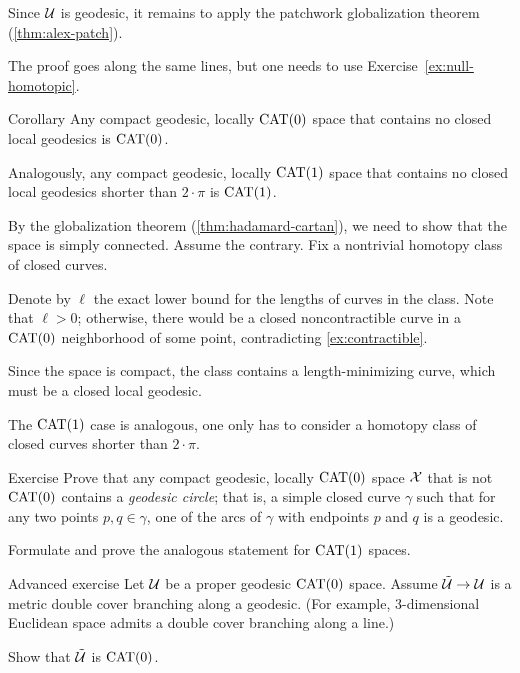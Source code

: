 Since $\mathcal{U}$ is geodesic, it remains to apply the patchwork globalization theorem (\ref{thm:alex-patch}).

The proof goes along the same lines, 
but one needs to use Exercise~\ref{ex:null-homotopic}. \qeds

\begin{thm}{Corollary}\label{cor:closed-geod-cat} 
Any compact geodesic, locally $\mathrm{CAT}(0)$ space that contains no closed local geodesics is $\mathrm{CAT}(0)$. 
 
Analogously, any compact geodesic, locally $\mathrm{CAT}(1)$ space that contains no closed local geodesics shorter than $2\cdot\pi$ is $\mathrm{CAT}(1)$.
\end{thm}

By the globalization theorem (\ref{thm:hadamard-cartan}), we need to show that the space is simply connected.
Assume the contrary. 
Fix a nontrivial homotopy class of closed curves.

Denote by $\ell$ the exact lower bound for the lengths of curves in the class.
Note that $\ell>0$;
otherwise, there would be a closed noncontractible curve in a $\mathrm{CAT}(0)$ neighborhood of some point, contradicting \ref{ex:contractible}.

Since the space is compact, the class contains a length-minimizing curve, 
which must be a closed local geodesic. 

The $\mathrm{CAT}(1)$ case is analogous, one only has to consider a homotopy class of closed curves shorter than $2\cdot\pi$.
\qeds

\begin{thm}{Exercise}\label{ex:geod-circle}
Prove that any compact geodesic, locally $\mathrm{CAT}(0)$ space $\mathcal{X}$ that is not $\mathrm{CAT}(0)$ contains a \emph{geodesic circle};
that is, a simple closed curve $\gamma$ such that 
for any two points $p,q\in\gamma$, one of the arcs of $\gamma$ with endpoints $p$ and $q$ is a  geodesic.

Formulate and prove the analogous statement for $\mathrm{CAT}(1)$ spaces.
\end{thm}

\begin{thm}{Advanced exercise}\label{ex:branching-cover} 
Let $\mathcal{U}$ be a proper geodesic $\mathrm{CAT}(0)$ space.
Assume $\tilde{\mathcal{U}}\to \mathcal{U}$ is a metric  double cover branching along a geodesic.
(For example, 3-dimensional Euclidean space admits a double cover branching along a line.)

Show that $\tilde{\mathcal{U}}$ is $\mathrm{CAT}(0)$.
\end{thm}




